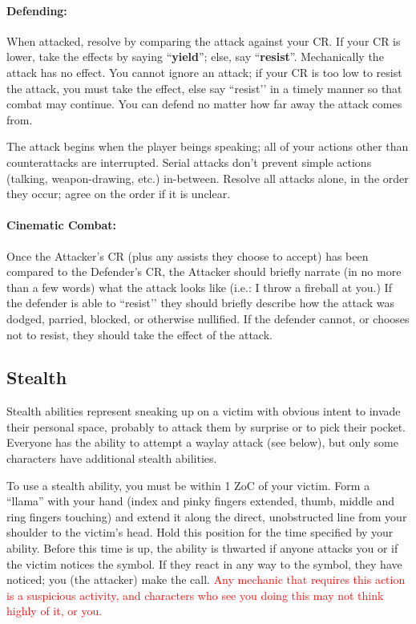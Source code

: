 \documentclass[sheet]{GL2020}
\begin{document}
\paragraph{Defending:} When attacked, resolve by comparing the attack against your CR.  If your CR is lower, take the effects by saying ``\textbf{yield}''; else, say ``{\bf resist}''. Mechanically the attack has no effect. You cannot ignore an attack; if your CR is too low to resist the attack, you must take the effect, else say ``resist'’ in a timely manner so that combat may continue. You can defend no matter how far away the attack comes from.

The attack begins when the player beings speaking; all of your actions other than counterattacks are interrupted. Serial attacks don't prevent simple actions (talking, weapon-drawing, etc.) in-between. Resolve all attacks alone, in the order they occur; agree on the order if it is unclear.

\paragraph{Cinematic Combat:} Once the Attacker's CR (plus any assists they choose to accept) has been compared to the Defender's CR, the Attacker should briefly narrate (in no more than a few words) what the attack looks like (i.e.: I throw a fireball at you.) If the defender is able to ``resist'’ they should briefly describe how the attack was dodged, parried, blocked, or otherwise nullified. If the defender cannot, or chooses not to resist, they should take the effect of the attack.

\subsection{Stealth}

Stealth abilities represent sneaking up on a victim with obvious intent to invade their personal space, probably to attack them by surprise or to pick their pocket. Everyone has the ability to attempt a waylay attack (see below), but only some characters have additional stealth abilities.

To use a stealth ability, you must be within 1 ZoC of your victim. Form a ``llama'' with your hand (index and pinky fingers extended, thumb, middle and ring fingers touching) and extend it along the direct, unobstructed line from your shoulder to the victim's head. Hold this position for the time specified by your ability. Before this time is up, the ability is thwarted if anyone attacks you or if the victim notices the symbol. If they react in any way to the symbol, they have noticed; you (the attacker) make the call. \textcolor{red}{Any mechanic that requires this action is a suspicious activity, and characters who see you doing this may not think highly of it, or you.}
\end{document}
